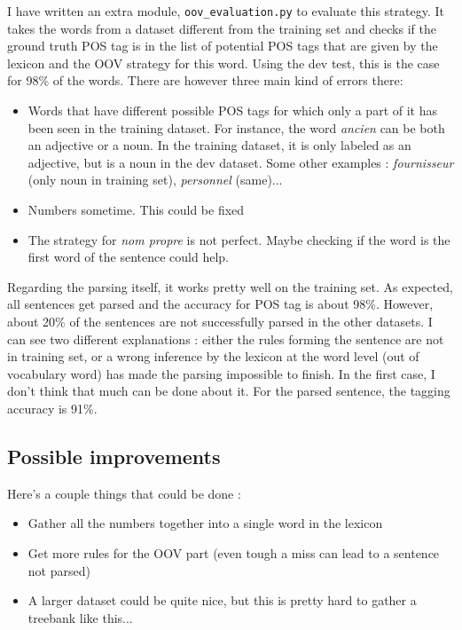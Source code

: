 \documentclass{article}
\begin{document}
I have written an extra module, \texttt{oov\_evaluation.py} to evaluate this
strategy. It takes the words from a dataset different from the training set and
checks if the ground truth POS tag is in the list of potential POS tags that are
given by the lexicon and the OOV strategy for this word. Using the dev test,
this is the case for 98\% of the words. There are however three main kind of
errors there:
\begin{itemize}
\item Words that have different possible POS tags for which only a part
  of it has been seen in the training dataset. For instance, the word
  \textit{ancien} can be both an adjective or a noun. In the training dataset,
  it is only labeled as an adjective, but is a noun in the dev dataset. Some other
  examples : \textit{fournisseur} (only noun in training set),
  \textit{personnel} (same)...
\item Numbers sometime. This could be fixed
\item The strategy for \textit{nom propre} is not perfect. Maybe checking if
  the word is the first word of the sentence could help.\\
\end{itemize}

Regarding the parsing itself, it works pretty well on the training set. As
expected, all sentences get parsed and the accuracy for POS tag is about 98\%.
However, about 20\% of the sentences are not successfully parsed in the other
datasets. I can see two different explanations : either the rules forming the
sentence are not in training set, or a wrong inference by the lexicon at the
word level (out of vocabulary word) has made the parsing impossible to finish.
In the first case, I don't think that much can be done about it. For the parsed
sentence, the tagging accuracy is 91\%.


\subsection{Possible improvements}

Here's a couple things that could be done :
\begin{itemize}
\item Gather all the numbers together into a single word in the lexicon
\item Get more rules for the OOV part (even tough a miss can lead to a sentence
  not parsed)
\item A larger dataset could be quite nice, but this is pretty hard to gather a
  treebank like this...
\end{itemize}
\end{document}
